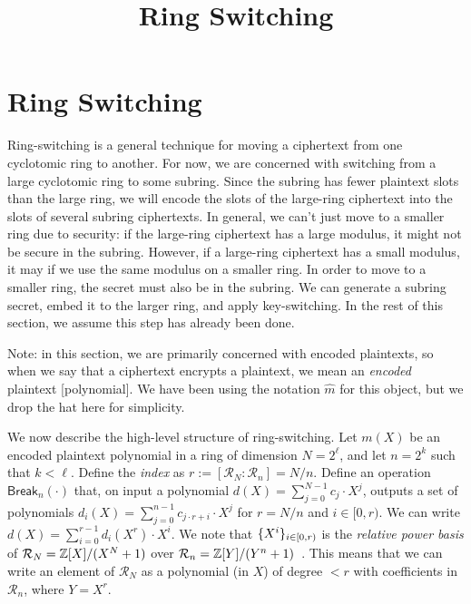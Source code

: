 \documentclass[../fheimpl.tex]{subfiles}
\begin{document}
	\ifcompileasbook
	\else
	\title{Ring Switching}
	\hypersetup{pageanchor=false}
	\maketitle
	\listoffixmes
	\tableofcontents
	\compileasbooktrue
	\hypersetup{pageanchor=true}
	\fi
	
	\section{Ring Switching}
	Ring-switching is a general technique for moving a ciphertext from one cyclotomic ring to another. For now, we are concerned with switching from a large cyclotomic ring to some subring. Since the subring has fewer plaintext slots than the large ring, we will encode the slots of the large-ring ciphertext into the slots of several subring ciphertexts. In general, we can't just move to a smaller ring due to security: if the large-ring ciphertext has a large modulus, it might not be secure in the subring. However, if a large-ring ciphertext has a small modulus, it may if we use the same modulus on a smaller ring. In order to move to a smaller ring, the secret must also be in the subring. We can generate a subring secret, embed it to the larger ring, and apply key-switching. In the rest of this section, we assume this step has already been done.
	
	Note: in this section, we are primarily concerned with encoded plaintexts, so when we say that a ciphertext encrypts a plaintext, we mean an \emph{encoded} plaintext [polynomial]. We have been using the notation $\hat{m}$ for this object, but we drop the hat here for simplicity.
	
	We now describe the high-level structure of ring-switching. Let $m(X)$ be an encoded plaintext polynomial in a ring of dimension $N=2^\ell$, and let $n=2^k$ such that $k<\ell$. Define the \emph{index} as $r:=[\mathcal{R}_N : \mathcal{R}_n]=N/n$. Define an operation $\mathsf{Break}_n(\cdot)$ that, on input a polynomial $d(X)=\sum_{j=0}^{N-1}c_j\cdot X^j$, outputs a set of polynomials $d_i(X)=\sum_{j=0}^{n-1} c_{j\cdot r+i}\cdot X^j$ for $r=N/n$ and $i\in[0, r)$. We can write $d(X)=\sum_{i=0}^{r-1} d_i(X^r)\cdot X^i$. We note that $\{X^i\}_{i\in[0,r)}$ is the \emph{relative power basis} of $\mathcal{R}_N=\mathbb{Z}[X]/(X^N+1)$ over $\mathcal{R}_n=\mathbb{Z}[Y]/(Y^n+1)$~\cite{cryptoeprint:2015/1134}. This means that we can write an element of $\mathcal{R}_N$ as a polynomial (in $X$) of degree $<r$ with coefficients in $\mathcal{R}_n$, where $Y=X^r$.
	
\end{document}
